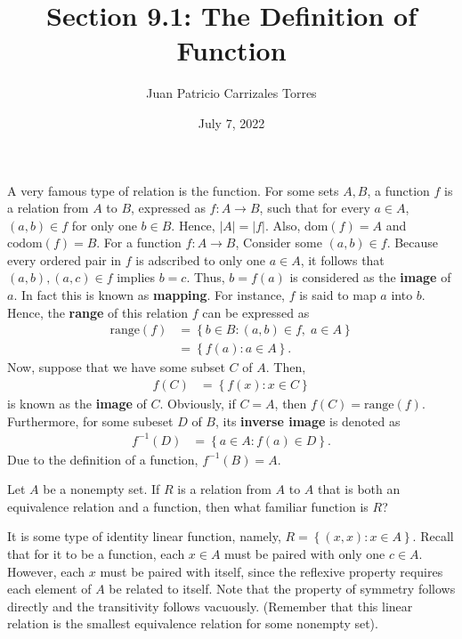 \documentclass[12pt]{article}
\newenvironment{problem}[2][Problem]{\begin{trivlist} \item[\hskip \labelsep {\bfseries #1}\hskip \labelsep {\bfseries #2.}]}{\end{trivlist}}
\newenvironment{solution}[2][Solution]{\begin{trivlist} \item[\hskip \labelsep {\bfseries #1}\hskip \labelsep {\bfseries #2.}]}{\end{trivlist}}
\begin{document}
 \title{Section 9.1: The Definition of Function}
   \author{Juan Patricio Carrizales Torres}
     \date{July 7, 2022}
       \maketitle
       A very famous type of relation is the function. For some sets $A,B$, a function $f$ is a relation from $A$ to $B$, expressed as $f:A\to B$, such that for every $a\in A$, $(a,b)\in f$ for only one $b\in B$. Hence, $|A|=|f|$. Also, $\text{dom}(f) = A$ and $\text{codom}(f)=B$. 
       For a function $f: A \to B$, Consider some $(a,b)\in f$. Because every ordered pair in $f$ is adscribed to only one $a\in A$, it follows that $(a,b),(a,c)\in f$ implies $b=c$. Thus, $b=f(a)$ is considered as the \textbf{image} of $a$. In fact this is known as \textbf{mapping}. For instance, $f$ is said to map $a$ into $b$. Hence, the \textbf{range} of this relation $f$ can be expressed as
       \begin{align*}
	 \text{range}(f) &=\left\{b \in B:  (a,b)\in f, \; a\in A\right\}\\
	 &= \left\{ f(a): a\in A \right\}.
       \end{align*}
 Now, suppose that we have some subset $C$ of $A$. Then, 
 \begin{align*}
   f(C) &= \left\{ f(x):x\in C \right\}
 \end{align*}
 is known as the \textbf{image} of $C$. Obviously, if $C=A$, then $f(C) = \text{range}(f)$. Furthermore, for some subeset $D$ of $B$, its \textbf{inverse image} is denoted as
 \begin{align*}
   f^{-1} (D) &= \left\{a\in A: f(a)\in D\right\}.
 \end{align*}
 Due to the definition of a function, $f^{-1} (B) = A$. 

 \begin{problem}{3}
   Let $A$ be a nonempty set. If $R$ is a relation from $A$ to $A$ that is both an equivalence relation and a function, then what familiar function is $R$?
   \begin{solution}{3}
     It is some type of identity linear function, namely, $R=\left\{(x,x):x\in A\right\}$. Recall that for it to be a function, each $x\in A$ must be paired with only one $c\in A$. However, each $x$ must be paired with itself, since the reflexive property requires each element of $A$ be related to itself. Note that the property of symmetry follows directly and the transitivity follows vacuously. (Remember that this linear relation is the smallest equivalence relation for some nonempty set). 
   \end{solution}
 \end{problem}
\end{document}
